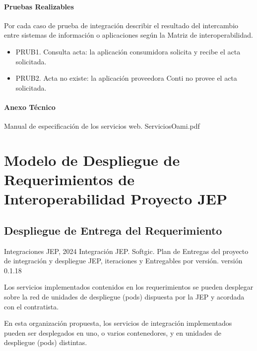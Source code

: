 \documentclass[
  paper=a4,
  ,captions=tableheading
]{scrartcl}
\providecommand{\tightlist}{%
  \setlength{\itemsep}{0pt}\setlength{\parskip}{0pt}}
\renewenvironment{quote}{\begin{customblockquote}\list{}{\rightmargin=0em\leftmargin=0em}%
\item\relax\color{blockquote-text}\ignorespaces}{\unskip\unskip\endlist\end{customblockquote}}
\begin{document}
\paragraph{Pruebas Realizables}\label{sec:pruebas-realizables-2}

Por cada caso de prueba de integración describir el resultado del
intercambio entre sistemas de información o aplicaciones según la Matriz
de interoperabilidad.

\begin{itemize}
\tightlist
\item
  PRUB1. Consulta acta: la aplicación consumidora solicita y recibe el
  acta solicitada.
\item
  PRUB2. Acta no existe: la aplicación proveedora Conti no provee el
  acta solicitada.
\end{itemize}

\paragraph{Anexo Técnico}\label{sec:anexo-tuxe9cnico-2}

Manual de especificación de los servicios web. ServiciosOami.pdf

\newpage

\section{Modelo de Despliegue de Requerimientos de Interoperabilidad
Proyecto
JEP}\label{sec:modelo-de-despliegue-de-requerimientos-de-interoperabilidad-proyecto-jep}

\subsection{Despliegue de Entrega del
Requerimiento}\label{sec:despliegue-de-entrega-del-requerimiento}

\begin{quote}
Integraciones JEP, 2024 Integración JEP. Softgic. Plan de Entregas del
proyecto de integración y despliegue JEP, iteraciones y Entregables por
versión. versión 0.1.18
\end{quote}

Los servicios implementados contenidos en los requerimientos se pueden
desplegar sobre la red de unidades de despliegue (pods) dispuesta por la
JEP y acordada con el contratista.

En esta organización propuesta, los servicios de integración
implementados pueden ser desplegados en uno, o varios contenedores, y en
unidades de despliegue (pods) distintas.
\end{document}
